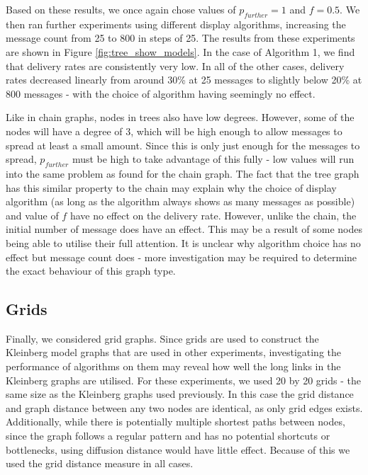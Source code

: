 \documentclass[bsc,frontabs,twoside,singlespacing,parskip,deptreport]{infthesis}     %
\begin{document}
Based on these results, we once again chose values of $p_{further}=1$ and $f=0.5$. We then ran further experiments using different display algorithms, increasing the message count from 25 to 800 in steps of 25. The results from these experiments are shown in Figure \ref{fig:tree_show_models}. In the case of Algorithm 1, we find that delivery rates are consistently very low. In all of the other cases, delivery rates decreased linearly from around 30\% at 25 messages to slightly below 20\% at 800 messages - with the choice of algorithm having seemingly no effect.

Like in chain graphs, nodes in trees also have low degrees. However, some of the nodes will have a degree of 3, which will be high enough to allow messages to spread at least a small amount. Since this is only just enough for the messages to spread, $p_{further}$ must be high to take advantage of this fully - low values will run into the same problem as found for the chain graph. The fact that the tree graph has this similar property to the chain may explain why the choice of display algorithm (as long as the algorithm always shows as many messages as possible) and value of $f$ have no effect on the delivery rate. However, unlike the chain, the initial number of message does have an effect. This may be a result of some nodes being able to utilise their full attention. It is unclear why algorithm choice has no effect but message count does - more investigation may be required to determine the exact behaviour of this graph type.


\subsection{Grids}
Finally, we considered grid graphs. Since grids are used to construct the Kleinberg model graphs that are used in other experiments, investigating the performance of algorithms on them may reveal how well the long links in the Kleinberg graphs are utilised. For these experiments, we used 20 by 20 grids - the same size as the Kleinberg graphs used previously. In this case the grid distance and graph distance between any two nodes are identical, as only grid edges exists. Additionally, while there is potentially multiple shortest paths between nodes, since the graph follows a regular pattern and has no potential shortcuts or bottlenecks, using diffusion distance would have little effect. Because of this we used the grid distance measure in all cases.
\end{document}
